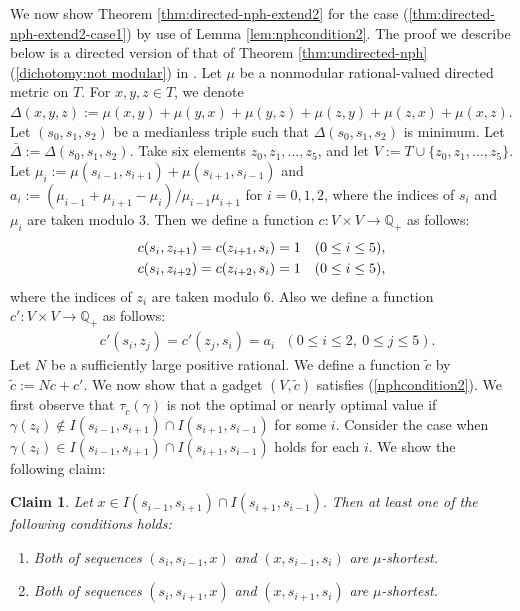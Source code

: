 \documentclass[11pt]{article}
\theoremstyle{definition}
\newtheorem{claim}{Claim}
\begin{document}
We now show Theorem \ref{thm:directed-nph-extend2} for the case (\ref{thm:directed-nph-extend2-case1}) by use of Lemma \ref{lem:nphcondition2}. The proof we describe below is a directed version of that of Theorem \ref{thm:undirected-nph} (\ref{dichotomy:not modular}) in \cite{karzanov2004}. Let $\mu$ be a nonmodular rational-valued directed metric on $T$. For $x,y,z\in T$, we denote $\Delta(x,y,z):=\mu(x,y)+\mu(y,x)+\mu(y,z)+\mu(z,y)+\mu(z,x)+\mu(x,z)$. Let $(s_0,s_1,s_2)$ be a medianless triple such that $\Delta(s_0,s_1,s_2)$ is minimum. 
Let $\bar{\Delta}:=\Delta(s_0,s_1,s_2)$. Take six elements $z_0,z_1,\ldots,z_5$, and let $V:=T\cup \{z_0,z_1,\ldots,z_5\}$. Let $\mu_i:=\mu(s_{i-1},s_{i+1})+\mu(s_{i+1},s_{i-1})$ and $a_i:=(\mu_{i-1}+\mu_{i+1}-\mu_i)/\mu_{i-1}\mu_{i+1}$ for $i=0,1,2$, where the indices of $s_i$ and $\mu_i$ are taken modulo 3. Then we define a function $c:V\times V\rightarrow \mathbb{Q}_+$ as follows:
\begin{align}
    &c(s_i,z_{i+1})=c(z_{i+1},s_i)=1\mathrm{\ \ \ }(0\leq i\leq 5),\notag\\
    &c(s_i,z_{i+2})=c(z_{i+2},s_i)=1\mathrm{\ \ \ }(0\leq i\leq 5),
\end{align}
where the indices of $z_i$ are taken modulo 6. Also we define a function $c':V\times V\rightarrow \mathbb{Q}_+$ as follows:
\begin{align}    
&c'(s_i,z_j)=c'(z_j,s_i)=a_i\mathrm{\ \ \ }(0\leq i\leq 2,\ 0\leq j\leq 5).
\end{align}
Let $N$ be a sufficiently large positive rational. We define a function $\tilde{c}$ by $\tilde{c}:=Nc+c'$. We now show that a gadget $(V,\tilde{c})$ satisfies (\ref{nphcondition2}). 
We first observe that $\tau_{\tilde{c}}(\gamma)$ is not the optimal or nearly optimal value if $\gamma(z_i)\notin I(s_{i-1},s_{i+1})\cap I(s_{i+1},s_{i-1})$ for some $i$. Consider the case when $\gamma(z_i)\in I(s_{i-1},s_{i+1})\cap I(s_{i+1},s_{i-1})$ holds for each $i$. We show the following claim:
\begin{claim}
\label{claim1}
\textit{Let} $x\in I(s_{i-1},s_{i+1})\cap I(s_{i+1},s_{i-1})$. \textit{Then at least one of the following conditions holds:}
\begin{enumerate}[label=(\roman*),ref=\roman*]
    \item \textit{Both of sequences} $(s_i,s_{i-1},x)$ \textit{and} $(x,s_{i-1},s_i)$ \textit{are} $\mu$\textit{-shortest.}
    \label{medianlesscondition1}
    \item \textit{Both of sequences} $(s_i,s_{i+1},x)$ \textit{and} $(x,s_{i+1},s_i)$ \textit{are} $\mu$\textit{-shortest.}
    \label{medianlesscondition2}
\end{enumerate}
\end{claim}
\end{document}
